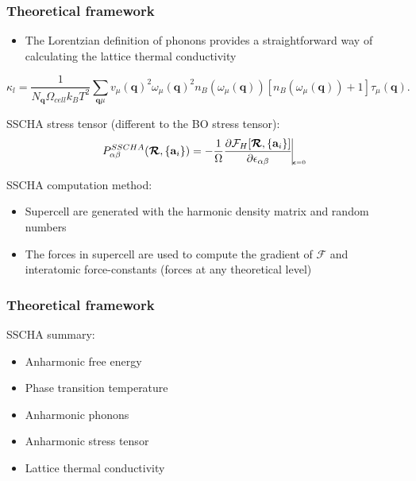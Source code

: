 \documentclass{beamer}
\begin{document}
\begin{frame}

\frametitle{Theoretical framework}
\begin{itemize}
 \item The Lorentzian definition of phonons provides a straightforward way of calculating the lattice thermal conductivity
\end{itemize}
\begin{equation}
\nonumber
 \kappa_{l}=\frac{1}{N_{\mathbf{q}}\Omega_{cell} k_{B}T^{2}}\sum_{\mathbf{q}\mu}v_{\mu}(\mathbf{q})^{2}\omega_{\mu}(\mathbf{q})^{2}n_{B}(\omega_{\mu}(\mathbf{q}))[n_{B}(\omega_{\mu}(\mathbf{q}))+1]\tau_{\mu}(\mathbf{q}).
\end{equation}

SSCHA stress tensor (different to the BO stress tensor):
\begin{equation}
\nonumber
 P_{\alpha\beta}^{SSCHA}(\boldsymbol{\mathcal{R}},\{\mathbf{a}_{i}\})=-\frac{1}{\Omega}\frac{\partial\mathcal{F}_{H}[\boldsymbol{\mathcal{R}},\{\mathbf{a}_{i}\}]}{\partial\epsilon_{\alpha\beta}}\vline_{_{_{_{_{_{_{_{
\boldsymbol{\epsilon}=0}}}}}}}}
\end{equation}

SSCHA computation method:
\begin{itemize}
\item Supercell are generated with the harmonic density matrix and random numbers
\item The forces in supercell are used to compute the gradient of $\mathcal{F}$ and interatomic force-constants (forces at any theoretical level)
\end{itemize}

\end{frame}


\begin{frame}

\frametitle{Theoretical framework}
SSCHA  summary:
\vspace{0.5cm}
\begin{itemize}
\item Anharmonic free energy
\item Phase transition temperature
\item Anharmonic phonons
\item Anharmonic stress tensor
\item Lattice thermal conductivity
\end{itemize}

\end{frame}
\end{document}

